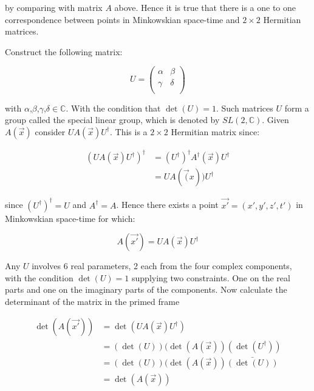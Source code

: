 \noindent by comparing with matrix $A$ above. Hence it is true that there is a one to one correspondence between points in Minkowskian space-time and $2 \times 2$ Hermitian matrices.

Construct the following matrix:

\begin{equation*} 
U = \left( 
\begin{array}{cc}
\alpha & \beta \\
\gamma & \delta \\
\end{array}
\right)
\end{equation*}

\noindent with $\alpha$,$\beta$,$\gamma$,$\delta \in \mathbb{C}$. With the condition that $\det(U) = 1$. Such matrices $U$ form a group called the special linear group, which is denoted by $SL(2, \mathbb{C})$. Given $A(\vec{x})$ consider $U A(\vec{x}) U^{\dagger}$. This is a $2 \times 2$ Hermitian matrix since:

\begin{eqnarray*}
(U A(\vec{x}) U^{\dagger})^{\dagger} & =  (U^{\dagger})^{\dagger} A^{\dagger}(\vec{x}) U^{\dagger} \\
                                     & = U A(\vec(x)) U^{\dagger}
\end{eqnarray*} 

\noindent since $(U^{\dagger})^{\dagger} = U$ and $A^{\dagger} = A$. Hence there exists a point $\vec{x'} = (x', y', z', t')$ in Minkowskian space-time for which:

\begin{equation}\label{SL_trans}
A(\vec{x'}) = U A(\vec{x}) U^{\dagger}
\end{equation}

Any $U$ involves 6 real parameters, 2 each from the four complex components, with the condition $\det(U) = 1$ supplying two constraints. One on the real parts and one on the imaginary parts of the components. Now calculate the determinant of the matrix in the primed frame

\begin{eqnarray*}  
\det(A(\vec{x'})) & = \det(U A(\vec{x}) U^{\dagger}) \\
                  & = (\det(U))(\det(A(\vec{x}))(\det(U^{\dagger})) \\
                  & = (\det(U))(\det(A(\vec{x}))\bar{(\det(U))} \\
                  & = \det(A(\vec{x}))
\end{eqnarray*}

